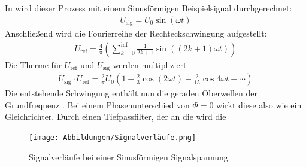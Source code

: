 In \cite[vgl.][]{man:v303} wird dieser Prozess mit einem Sinusförmigen Beispielsignal durchgerechnet:
\begin{align}
    U_\text{sig} = U_{0} \sin(\omega t) 
\end{align}
Anschließend wird die Fourierreihe der Rechteckschwingung aufgestellt:
% 
\begin{align}
    U_\text{ref} = \frac{4}{\pi} \left(\sum_{k=0}^{\inf} \frac{1}{2k+1} \sin((2k+1)\omega t)\right)
\end{align}
Die Therme für $U_\text{ref}$ und $U_\text{sig}$ werden multipliziert
\begin{align}
    U_\text{sig} \cdot U_\text{ref} = 
    \frac{2}{\pi} U_0 \left(1 - \frac{2}{3} \cos(2 \omega t) - \frac{2}{15}\cos{4 \omega t} - \cdots \right) 
\end{align}
Die entstehende Schwingung enthält nun die geraden Oberwellen der Grundfrequenz \cite[vgl.][]{man:v303}.
Bei einem Phasenunterschied von $\Phi=0$ wirkt diese also wie ein Gleichrichter.
Durch einen Tiefpassfilter, der an die wird die 

\begin{figure}
    \centering
    \texttt{[image: Abbildungen/Signalverläufe.png]}
    \caption{Signalverläufe bei einer Sinusförmigen Signalspannung \cite{man:v303}}
\end{figure}



